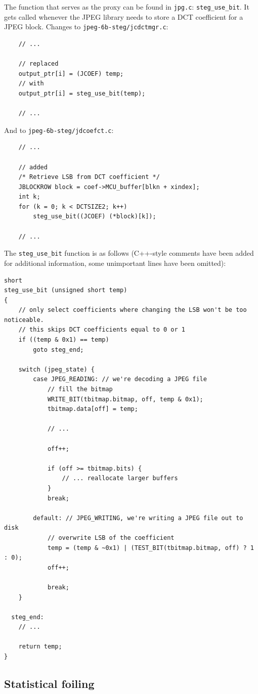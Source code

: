 \documentclass{article}
\begin{document}
The function that serves as the proxy can be found in \texttt{jpg.c}: \texttt{steg\_use\_bit}. It gets called whenever the JPEG library needs to store a DCT coefficient for a JPEG block. Changes to \texttt{jpeg-6b-steg/jcdctmgr.c}:
\begin{verbatim}
	// ...

	// replaced
	output_ptr[i] = (JCOEF) temp;
	// with
	output_ptr[i] = steg_use_bit(temp);

	// ...
\end{verbatim}
And to \texttt{jpeg-6b-steg/jdcoefct.c}:
\begin{verbatim}
	// ...

	// added
	/* Retrieve LSB from DCT coefficient */
	JBLOCKROW block = coef->MCU_buffer[blkn + xindex];
	int k;
	for (k = 0; k < DCTSIZE2; k++)
		steg_use_bit((JCOEF) (*block)[k]);

	// ...
\end{verbatim}

The \texttt{steg\_use\_bit} function is as follows (C++-style comments have been added for additional information, some unimportant lines have been omitted):
\begin{verbatim}
short
steg_use_bit (unsigned short temp)
{
	// only select coefficients where changing the LSB won't be too noticeable.
	// this skips DCT coefficients equal to 0 or 1
	if ((temp & 0x1) == temp)
		goto steg_end;
	
	switch (jpeg_state) {
		case JPEG_READING: // we're decoding a JPEG file
			// fill the bitmap
			WRITE_BIT(tbitmap.bitmap, off, temp & 0x1);
			tbitmap.data[off] = temp;

			// ...		
		
			off++;
		
			if (off >= tbitmap.bits) {
				// ... reallocate larger buffers
			}
			break;

		default: // JPEG_WRITING, we're writing a JPEG file out to disk
			// overwrite LSB of the coefficient
			temp = (temp & ~0x1) | (TEST_BIT(tbitmap.bitmap, off) ? 1 : 0);
			off++;
		
			break;
	}

  steg_end:
	// ...
	
	return temp;
}
\end{verbatim}

\subsection{Statistical foiling}
\end{document}
